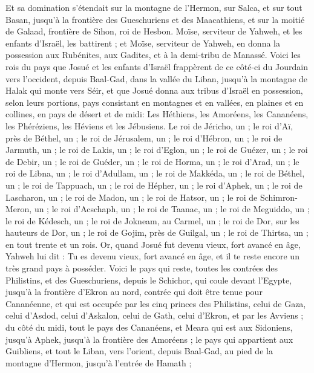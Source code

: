 \begin{multicols}{2}
Et sa domination s'étendait sur la montagne de l'Hermon, sur Salca, et sur tout Basan, jusqu'à la frontière des Gueschuriens et des Maacathiens, et sur la moitié de Galaad, frontière de Sihon, roi de Hesbon.
Moïse, serviteur de Yahweh, et les enfants d'Israël, les battirent ; et Moïse, serviteur de Yahweh, en donna la possession aux Rubénites, aux Gadites, et à la demi-tribu de Manassé.
Voici les rois du pays que Josué et les enfants d'Israël frappèrent de ce côté-ci du Jourdain vers l'occident, depuis Baal-Gad, dans la vallée du Liban, jusqu'à la montagne de Halak qui monte vers Séir, et que Josué donna aux tribus d'Israël en possession, selon leurs portions,
pays consistant en montagnes et en vallées, en plaines et en collines, en pays de désert et de midi: Les Héthiens, les Amoréens, les Cananéens, les Phéréziens, les Héviens et les Jébusiens.
Le roi de Jéricho, un ; le roi d'Aï, près de Béthel, un ;
le roi de Jérusalem, un ; le roi d'Hébron, un ;
le roi de Jarmuth, un ; le roi de Lakis, un ;
le roi d'Eglon, un ; le roi de Guézer, un ;
le roi de Debir, un ; le roi de Guéder, un ;
le roi de Horma, un ; le roi d'Arad, un ;
le roi de Libna, un ; le roi d'Adullam, un ;
le roi de Makkéda, un ; le roi de Béthel, un ;
le roi de Tappuach, un ; le roi de Hépher, un ;
le roi d'Aphek, un ; le roi de Lascharon, un ;
le roi de Madon, un ; le roi de Hatsor, un ;
le roi de Schimron-Meron, un ; le roi d'Acschaph, un ;
le roi de Taanac, un ; le roi de Meguiddo, un ;
le roi de Kédesch, un ; le roi de Jokneam, au Carmel, un ;
le roi de Dor, sur les hauteurs de Dor, un ; le roi de Gojim, près de Guilgal, un ;
le roi de Thirtsa, un ; en tout trente et un rois.
\VerseOne{}Or, quand Josué fut devenu vieux, fort avancé en âge, Yahweh lui dit : Tu es devenu vieux, fort avancé en âge, et il te reste encore un très grand pays à posséder.
Voici le pays qui reste, toutes les contrées des Philistins, et des Gueschuriens,
depuis le Schichor, qui coule devant l'Egypte, jusqu'à la frontière d'Ekron au nord, contrée qui doit être tenue pour Cananéenne, et qui est occupée par les cinq princes des Philistins, celui de Gaza, celui d'Asdod, celui d'Askalon, celui de Gath, celui d'Ekron, et par les Avviens ;
du côté du midi, tout le pays des Cananéens, et Meara qui est aux Sidoniens, jusqu'à Aphek, jusqu'à la frontière des Amoréens ;
le pays qui appartient aux Guibliens, et tout le Liban, vers l'orient, depuis Baal-Gad, au pied de la montagne d'Hermon, jusqu'à l'entrée de Hamath ;

\end{multicols}
